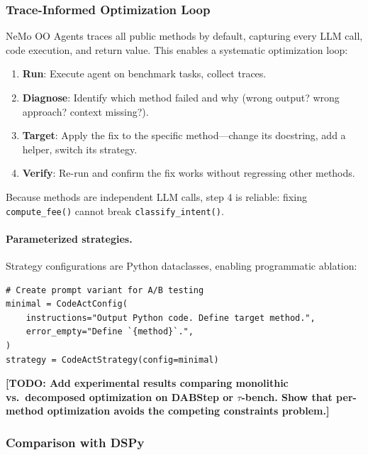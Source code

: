 \documentclass[11pt, logo, onecolumn, copyright, colorlinks=true, allcolors=blue]{nvidiatechreport}
\newcommand{\placeholder}[1]{\textcolor{red!60!black}{\textbf{[TODO: #1]}}}
\begin{document}
\subsubsection{Trace-Informed Optimization Loop}
\label{sec:optimization:loop}

NeMo OO Agents traces all public methods by default, capturing every LLM call, code
execution, and return value. This enables a systematic optimization loop:

\begin{enumerate}
  \item \textbf{Run}: Execute agent on benchmark tasks, collect traces.
  \item \textbf{Diagnose}: Identify which method failed and why (wrong output?
        wrong approach? context missing?).
  \item \textbf{Target}: Apply the fix to the specific method---change its
        docstring, add a helper, switch its strategy.
  \item \textbf{Verify}: Re-run and confirm the fix works without regressing
        other methods.
\end{enumerate}

Because methods are independent LLM calls, step 4 is reliable: fixing
\texttt{compute\_fee()} cannot break \texttt{classify\_intent()}.

\paragraph{Parameterized strategies.} Strategy configurations are Python
dataclasses, enabling programmatic ablation:

\begin{lstlisting}
# Create prompt variant for A/B testing
minimal = CodeActConfig(
    instructions="Output Python code. Define target method.",
    error_empty="Define `{method}`.",
)
strategy = CodeActStrategy(config=minimal)
\end{lstlisting}

\placeholder{Add experimental results comparing monolithic vs.\ decomposed
optimization on DABStep or $\tau$-bench. Show that per-method optimization
avoids the competing constraints problem.}

\subsubsection{Comparison with DSPy}
\label{sec:optimization:dspy}
\end{document}
